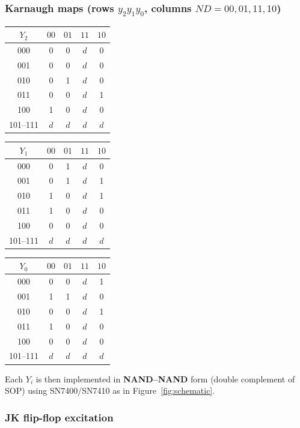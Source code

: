 \documentclass[12pt, letterpaper]{article}
\begin{document}
\subsubsection*{Karnaugh maps (rows $y_2y_1y_0$, columns $ND{=}00,01,11,10$)}

\begin{center}
\footnotesize
\begin{tabular}{|c|cccc|}
  \hline
  $Y_2$ & $00$ & $01$ & $11$ & $10$ \\
  \hline
  000 & 0 & 0 & $d$ & 0 \\
  001 & 0 & 0 & $d$ & 0 \\
  010 & 0 & 1 & $d$ & 0 \\
  011 & 0 & 0 & $d$ & 1 \\
  100 & 1 & 0 & $d$ & 0 \\
  101--111 & $d$ & $d$ & $d$ & $d$ \\
  \hline
\end{tabular}
\quad
\begin{tabular}{|c|cccc|}
  \hline
  $Y_1$ & $00$ & $01$ & $11$ & $10$ \\
  \hline
  000 & 0 & 1 & $d$ & 0 \\
  001 & 0 & 1 & $d$ & 1 \\
  010 & 1 & 0 & $d$ & 1 \\
  011 & 1 & 0 & $d$ & 0 \\
  100 & 0 & 0 & $d$ & 0 \\
  101--111 & $d$ & $d$ & $d$ & $d$ \\
  \hline
\end{tabular}
\quad
\begin{tabular}{|c|cccc|}
  \hline
  $Y_0$ & $00$ & $01$ & $11$ & $10$ \\
  \hline
  000 & 0 & 0 & $d$ & 1 \\
  001 & 1 & 1 & $d$ & 0 \\
  010 & 0 & 0 & $d$ & 1 \\
  011 & 1 & 0 & $d$ & 0 \\
  100 & 0 & 0 & $d$ & 0 \\
  101--111 & $d$ & $d$ & $d$ & $d$ \\
  \hline
\end{tabular}
\end{center}

Each $Y_i$ is then implemented in \textbf{NAND--NAND} form (double complement of SOP) using
SN7400/SN7410 as in Figure~\ref{fig:schematic}.

\subsubsection*{JK flip-flop excitation}
\end{document}
